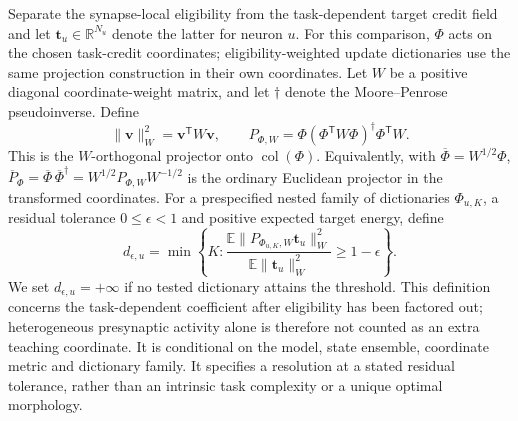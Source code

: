 Separate the synapse-local eligibility from the task-dependent target credit
field and let $\bm t_u\in\mathbb R^{N_u}$ denote the latter for neuron $u$.
For this comparison, $\Phi$ acts on the chosen task-credit coordinates;
eligibility-weighted update dictionaries use the same projection construction
in their own coordinates. Let $W$ be a positive diagonal coordinate-weight
matrix, and let $\dagger$ denote the Moore--Penrose pseudoinverse. Define
\begin{equation}
\lVert\bm v\rVert_W^2=\bm v^{\mathsf T}W\bm v,
\qquad
P_{\Phi,W}=\Phi(\Phi^{\mathsf T}W\Phi)^\dagger\Phi^{\mathsf T}W.
\label{eq:s_weighted_projector}
\end{equation}
This is the $W$-orthogonal projector onto $\operatorname{col}(\Phi)$.
Equivalently, with $\overline\Phi=W^{1/2}\Phi$,
$\overline P_\Phi=\overline\Phi\,\overline\Phi^\dagger
=W^{1/2}P_{\Phi,W}W^{-1/2}$ is the ordinary Euclidean projector in the
transformed coordinates.
For a prespecified nested family of dictionaries $\Phi_{u,K}$, a residual
tolerance $0\leq\epsilon<1$ and positive expected target energy, define
\begin{equation}
d_{\epsilon,u}=\min\left\{K:
\frac{\mathbb E\lVert P_{\Phi_{u,K},W}\bm t_u\rVert_W^2}
{\mathbb E\lVert\bm t_u\rVert_W^2}\geq1-\epsilon\right\}.
\label{eq:s_address_dimension}
\end{equation}
We set $d_{\epsilon,u}=+\infty$ if no tested dictionary attains the threshold. This definition concerns the task-dependent coefficient after eligibility has
been factored out; heterogeneous presynaptic activity alone is therefore not
counted as an extra teaching coordinate. It is conditional on the model,
state ensemble, coordinate metric and dictionary family. It specifies a
resolution at a stated residual tolerance, rather than an intrinsic task
complexity or a unique optimal morphology.

